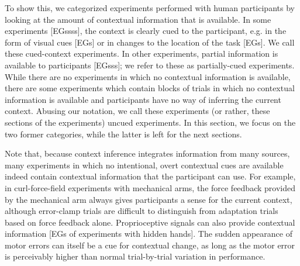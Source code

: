 \documentclass[a4paper,doc,floatsintext,natbib]{apa6}
\begin{document}
To show this, we categorized experiments performed with human participants by looking at the amount of contextual information that is available. In some experiments [EGssss], the context is clearly cued to the participant, e.g. in the form of visual cues [EGs] or in changes to the location of the task [EGs]. We call these cued-context experiments. In other experiments, partial information is available to participants [EGsss]; we refer to these as partially-cued experiments. While there are no experiments in which no contextual information is available, there are some experiments which contain blocks of trials in which no contextual information is available and participants have no way of inferring the current context. Abusing our notation, we call these experiments (or rather, these sections of the experiments) uncued experiments. In this section, we focus on the two former categories, while the latter is left for the next sections.

Note that, because context inference integrates information from many sources, many experiments in which no intentional, overt contextual cues are available indeed contain contextual information that the participant can use. For example, in curl-force-field experiments with mechanical arms, the force feedback provided by the mechanical arm always gives participants a sense for the current context, although error-clamp trials are difficult to distinguish from adaptation trials based on force feedback alone. Proprioceptive signals can also provide contextual information [EGs of experiments with hidden hands]. The sudden appearance of motor errors can itself be a cue for contextual change, as long as the motor error is perceivably higher than normal trial-by-trial variation in performance.
\end{document}
